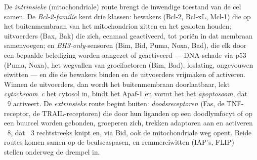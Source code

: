 \begin{definition}\label{def:b3:cell-cycle-apoptosis:pathways}
De \emph{intrinsieke} (mitochondriale) route brengt de inwendige
toestand van de cel samen. De \emph{Bcl-2-familie} kent drie klassen:
bewakers (Bcl-2, Bcl-xL, Mcl-1) die op het buitenmembraan van het
mitochondrion zitten en het gesloten houden; uitvoerders (Bax, Bak)
die zich, eenmaal geactiveerd, tot poriën in dat membraan
samenvoegen; en \emph{BH3-only}-sensoren (Bim, Bid, Puma, Noxa, Bad),
die elk door een bepaalde belediging worden aangezet of geactiveerd ---
DNA-schade via p53 (Puma, Noxa), het wegvallen van groeifactoren (Bim,
Bad), loslating, ongevouwen eiwitten --- en die de bewakers binden en de
uitvoerders vrijmaken of activeren. Winnen de uitvoerders, dan wordt
het buitenmembraan doorlaatbaar, lekt \emph{cytochroom~c} het cytosol
in, bindt het Apaf-1 en vormt het het \emph{apoptosoom}, dat ~9
activeert. De \emph{extrinsieke} route begint buiten:
\emph{doodsreceptoren} (Fas, de TNF-receptor, de TRAIL-receptoren) die
door hun liganden op een doodlymfocyt of op een buurcel worden
gebonden, groeperen zich, trekken adaptoren aan en activeren ~8,
dat ~3 rechtstreeks knipt en, via Bid, ook de mitochondriale
weg opent. Beide routes komen samen op de beulscaspasen, en
remmereiwitten (IAP's, FLIP) stellen onderweg de drempel in.
\end{definition}


